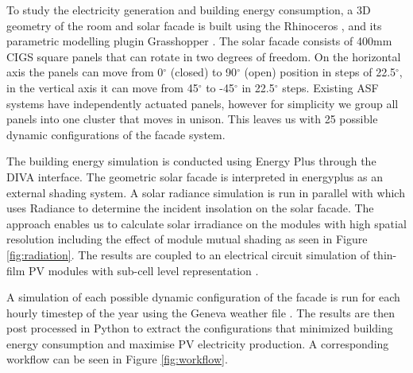 
To study the electricity generation and building energy consumption, a 3D geometry of the room and solar facade is built using the Rhinoceros \cite{Rhino}, and its parametric modelling plugin Grasshopper \cite{grasshopper}. The solar facade consists of 400mm CIGS square panels that can rotate in two degrees of freedom. On the horizontal axis the panels can move from 0$^{\circ}$ (closed) to 90$^{\circ}$ (open) position in steps of 22.5$^{\circ}$, in the vertical axis it can move from 45$^{\circ}$ to -45$^{\circ}$ in 22.5$^{\circ}$ steps. Existing ASF systems \cite{nagy2015frontiers} have independently actuated panels, however for simplicity we group all panels into one cluster that moves in unison. This leaves us with 25 possible dynamic configurations of the facade system. 

The building energy simulation is conducted using Energy Plus \cite{energyplus} through the DIVA \cite{DIVA} interface. The geometric solar facade is interpreted in energyplus as an external shading system. A solar radiance simulation is run in parallel with \cite{roudsari2014ladybug}  which uses Radiance \cite{ward1994radiance} to determine the incident insolation on the solar facade. The approach enables us to calculate solar irradiance on the modules with high spatial resolution including the effect of module mutual shading as seen in Figure \ref{fig:radiation}. The results are coupled to an electrical circuit simulation of thin-film PV modules with sub-cell level representation \cite{hofer2015PVSEC}.

A simulation of each possible dynamic configuration of the facade is run for each hourly timestep of the year using the Geneva weather file \cite{genevaweatherfile}. The results are then post processed in Python \cite{python} to extract the configurations that minimized building energy consumption and maximise PV electricity production. A corresponding workflow can be seen in Figure \ref{fig:workflow}. 




